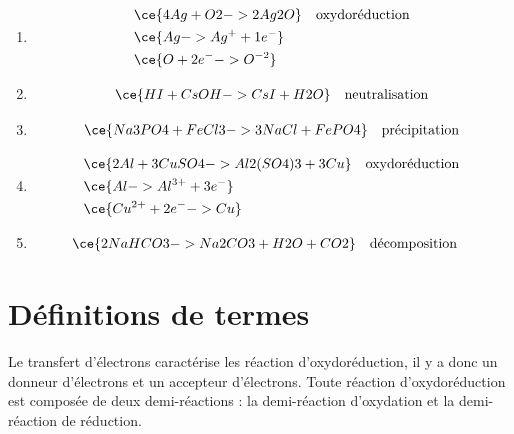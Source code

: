 \documentclass[
  11pt,
  a4paper,
  openany]{book}
\providecommand{\tightlist}{%
  \setlength{\itemsep}{0pt}\setlength{\parskip}{0pt}}
\begin{document}
\begin{Answer}

\begin{enumerate}
\def\labelenumi{\alph{enumi}.}
\tightlist
\item
  \[
  \begin{split}
  & \ce{4 Ag + O2 -> 2 Ag2O} \quad \text{oxydoréduction} \\
  & \ce{Ag -> Ag^+ + 1e^-} \\
  & \ce{O + 2e^- -> O^{-2}}
  \end{split}
  \]
\item
  \[
  \begin{split}
  \ce{HI + CsOH -> CsI + H2O} \quad \text{neutralisation}
  \end{split}
  \]
\item
  \[
  \begin{split}
  \ce{Na3PO4 + FeCl3 -> 3 NaCl + FePO4} \quad \text{précipitation}
  \end{split}
  \]
\item
  \[
  \begin{split}
  & \ce{2 Al + 3 CuSO4 -> Al2(SO4)3 + 3 Cu} \quad \text{oxydoréduction} \\
  & \ce{Al -> Al^{3+} + 3e^-} \\
  & \ce{Cu^{2+} + 2e^- -> Cu}
  \end{split}
  \]
\item
  \[
  \begin{split}
  & \ce{2 NaHCO3 -> Na2CO3 + H2O + CO2} \quad \text{décomposition}
  \end{split}
  \]
\end{enumerate}

\end{Answer}

\clearpage

\section{Définitions de termes}\label{duxe9finitions-de-termes}

Le transfert d'électrons caractérise les réaction d'oxydoréduction, il y a donc un donneur d'électrons et un accepteur d'électrons. Toute réaction d'oxydoréduction est composée de deux demi-réactions : la demi-réaction d'oxydation et la demi-réaction de réduction.
\end{document}
